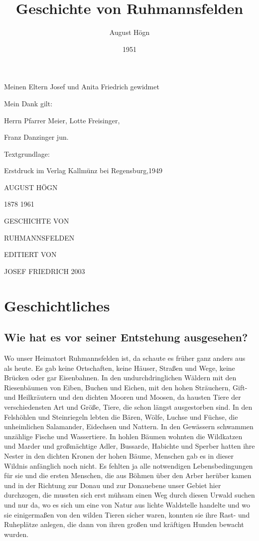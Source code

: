 \documentclass[12pt,a4paper]{book}
\author{August Högn}
\title{Geschichte von Ruhmannsfelden}
\date{1951}
\begin{document}
\maketitle

Meinen Eltern Josef und Anita Friedrich gewidmet

Mein Dank gilt:

Herrn Pfarrer Meier, Lotte Freisinger,

Franz Danzinger jun.

Textgrundlage:

Erstdruck im Verlag Kallmünz bei Regensburg,1949

\tableofcontents

\newpage

AUGUST HÖGN

1878 1961

GESCHICHTE VON

RUHMANNSFELDEN

EDITIERT VON

JOSEF FRIEDRICH 2003

\part{Geschichtliches}

\chapter{Wie hat es vor seiner Entstehung ausgesehen?}

Wo unser Heimatort Ruhmannsfelden ist, da schaute es früher ganz anders aus als
heute. Es gab keine Ortschaften, keine Häuser, Straßen und Wege, keine Brücken
oder gar Eisenbahnen. In den undurchdringlichen Wäldern mit den Riesenbäumen von
Eiben, Buchen und Eichen, mit den hohen Sträuchern, Gift- und Heilkräutern und
den dichten Mooren und Moosen, da hausten Tiere der verschiedensten Art und
Größe, Tiere, die schon längst ausgestorben sind. In den Felshöhlen und
Steinriegeln lebten die Bären, Wölfe, Luchse und Füchse, die unheimlichen
Salamander, Eidechsen und Nattern. In den Gewässern schwammen unzählige Fische
und Wassertiere. In hohlen Bäumen wohnten die Wildkatzen und Marder und
großmächtige Adler, Bussarde, Habichte und Sperber hatten ihre Nester in den
dichten Kronen der hohen Bäume, Menschen gab es in dieser Wildnis anfänglich
noch nicht. Es fehlten ja alle notwendigen Lebensbedingungen für sie und die
ersten Menschen, die aus Böhmen über den Arber herüber kamen und in der Richtung
zur Donau und zur Donauebene unser Gebiet hier durchzogen, die mussten sich erst
mühsam einen Weg durch diesen Urwald suchen und nur da, wo es sich um eine von
Natur aus lichte Waldstelle handelte und wo sie einigermaßen von den wilden
Tieren sicher waren, konnten sie ihre Rast- und Ruheplätze anlegen, die dann von
ihren großen und kräftigen Hunden bewacht wurden.
\end{document}
